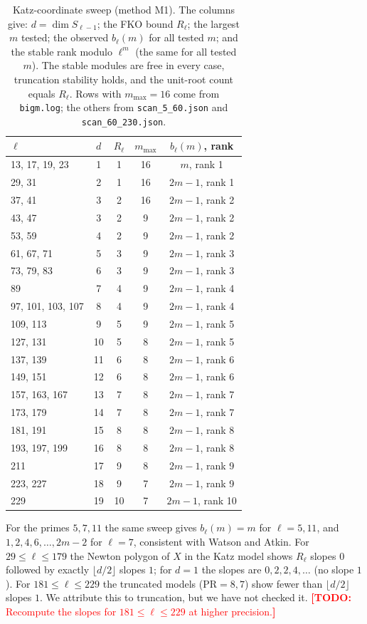 \documentclass[11pt]{amsart}
\newcommand{\TODO}[1]{\textcolor{red}{\textbf{[TODO:} #1\textbf{]}}}
\theoremstyle{plain}
\theoremstyle{definition}
\numberwithin{equation}{section}
\begin{document}
\begin{table}[ht]
\centering\small
\caption{Katz-coordinate sweep (method M1). The columns give: $d=\dim S_{\ell-1}$; the FKO bound $R_\ell$; the largest $m$
tested; the observed $b_\ell(m)$ for all tested $m$; and the stable rank modulo $\ell^m$ (the same for all tested $m$). The
stable modules are free in every case, truncation stability holds, and the unit-root count equals $R_\ell$. Rows with
$m_{\max}=16$ come from \texttt{bigm.log}; the others from \texttt{scan\_5\_60.json} and \texttt{scan\_60\_230.json}.}\label{tab:sweep}
\begin{tabular}{@{}lcccc@{}}
\toprule
$\ell$ & $d$ & $R_\ell$ & $m_{\max}$ & $b_\ell(m)$, rank\\
\midrule
13, 17, 19, 23 & 1 & 1 & 16 & $m$, rank 1\\
29, 31 & 2 & 1 & 16 & $2m-1$, rank 1\\
37, 41 & 3 & 2 & 16 & $2m-1$, rank 2\\
43, 47 & 3 & 2 & 9 & $2m-1$, rank 2\\
53, 59 & 4 & 2 & 9 & $2m-1$, rank 2\\
61, 67, 71 & 5 & 3 & 9 & $2m-1$, rank 3\\
73, 79, 83 & 6 & 3 & 9 & $2m-1$, rank 3\\
89 & 7 & 4 & 9 & $2m-1$, rank 4\\
97, 101, 103, 107 & 8 & 4 & 9 & $2m-1$, rank 4\\
109, 113 & 9 & 5 & 9 & $2m-1$, rank 5\\
127, 131 & 10 & 5 & 8 & $2m-1$, rank 5\\
137, 139 & 11 & 6 & 8 & $2m-1$, rank 6\\
149, 151 & 12 & 6 & 8 & $2m-1$, rank 6\\
157, 163, 167 & 13 & 7 & 8 & $2m-1$, rank 7\\
173, 179 & 14 & 7 & 8 & $2m-1$, rank 7\\
181, 191 & 15 & 8 & 8 & $2m-1$, rank 8\\
193, 197, 199 & 16 & 8 & 8 & $2m-1$, rank 8\\
211 & 17 & 9 & 8 & $2m-1$, rank 9\\
223, 227 & 18 & 9 & 7 & $2m-1$, rank 9\\
229 & 19 & 10 & 7 & $2m-1$, rank 10\\
\bottomrule
\end{tabular}
\end{table}
For the primes $5,7,11$ the same sweep gives $b_\ell(m)=m$ for $\ell=5,11$, and $1,2,4,6,\dots,2m-2$ for $\ell=7$, consistent with
Watson and Atkin. For $29\le\ell\le179$ the Newton polygon of $X$ in the Katz model shows $R_\ell$ slopes $0$ followed by
exactly $\lfloor d/2\rfloor$ slopes $1$; for $d=1$ the slopes are $0,2,2,4,\dots$ (no slope $1$). For $181\le\ell\le229$ the
truncated models ($\mathrm{PR}=8,7$) show fewer than $\lfloor d/2\rfloor$ slopes $1$. We attribute this to truncation, but
we have not checked it. \TODO{Recompute the slopes for $181\le\ell\le229$ at higher precision.}
\end{document}
